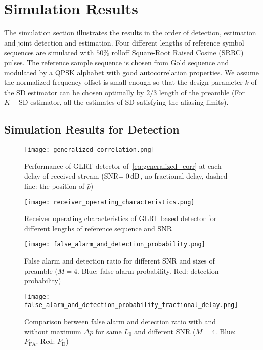 \section{Simulation Results}%
\label{sec:simulations}

The simulation section illustrates the results in the order of detection, estimation and joint detection and estimation.
Four different lengths of reference symbol sequences are simulated with $50\%$ rolloff Square-Root Raised Cosine (SRRC) pulses.
The reference sample sequence is chosen from Gold sequence and modulated by a QPSK alphabet with good autocorrelation properties.
We assume the normalized frequency offset is small enough so that the design parameter $k$ of the SD estimator
can be chosen optimally by $2/3$ length of the preamble (For $K-$SD estimator, all the estimates of SD satisfying the aliasing limits). 

\subsection{Simulation Results for Detection}

\begin{figure}[t]
    \centerline{\texttt{[image: generalized\_correlation.png]}}
    \caption{Performance of GLRT detector of~\eqref{eq:generalized_corr} at each delay of received stream (SNR$=\numb{0}\dB$, no fractional delay, dashed line: the position of $\bar{p}$)}
    \label{fig:Generalized correlation}
    \end{figure}

\begin{figure}[t]
    \centerline{\texttt{[image: receiver\_operating\_characteristics.png]}}
    \caption{Receiver operating characteristics of GLRT based detector for different lengths of reference sequence and SNR}
    \label{fig:Receiver operating characteristics}
    \end{figure}

\begin{figure}[t]
    \centerline{\texttt{[image: false\_alarm\_and\_detection\_probability.png]}}
    \caption{False alarm and detection ratio for different SNR and sizes of preamble ($M=4$. Blue: false alarm probability. Red: detection probability)}
    \label{fig:False alarm and detection}
    \end{figure}

\begin{figure}[t]
    \centerline{\texttt{[image: false\_alarm\_and\_detection\_probability\_fractional\_delay.png]}}
    \caption{Comparison between false alarm and detection ratio with and without maximum $\Delta p$ for same $L_0$ and different SNR ($M=4$. Blue: $P_{\text{FA}}$. Red: $P_{\text{D}}$)}
    \label{fig:False alarm and detection with frac delay}
    \end{figure}


